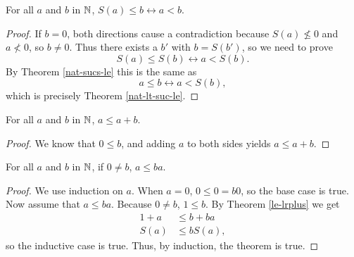 \documentclass[../math.tex]{subfiles}
\begin{document}
\begin{theorem} \label{nat-le-suc-lt}
    For all $a$ and $b$ in $\mathbb{N}$, $S(a) \leq b \leftrightarrow a < b$.
\end{theorem}
\begin{proof}
    If $b = 0$, both directions cause a contradiction because $S(a) \nleq 0$ and
    $a \nless 0$, so $b \neq 0$.  Thus there exists a $b'$ with $b = S(b')$, so
    we need to prove
    \[
        S(a) \leq S(b) \leftrightarrow a < S(b).
    \]
    By Theorem \ref{nat-sucs-le} this is the same as
    \[
        a \leq b \leftrightarrow a < S(b),
    \]
    which is precisely Theorem \ref{nat-lt-suc-le}.
\end{proof}

\begin{theorem} \label{nat-le-self-lplus}
    For all $a$ and $b$ in $\mathbb{N}$, $a \leq a + b$.
\end{theorem}
\begin{proof}
    We know that $0 \leq b$, and adding $a$ to both sides yields $a \leq a + b$.
\end{proof}

\begin{theorem} \label{nat-le-self-lmult}
    For all $a$ and $b$ in $\mathbb{N}$, if $0 \neq b$, $a \leq ba$.
\end{theorem}
\begin{proof}
    We use induction on $a$.  When $a = 0$, $0 \leq 0 = b0$, so the base case is
    true.  Now assume that $a \leq ba$.  Because $0 \neq b$, $1 \leq b$.  By
    Theorem \ref{le-lrplus} we get
    \begin{align*}
        1 + a &\leq b + ba \\
        S(a) &\leq bS(a),
    \end{align*}
    so the inductive case is true.  Thus, by induction, the theorem is true.
\end{proof}
\end{document}
